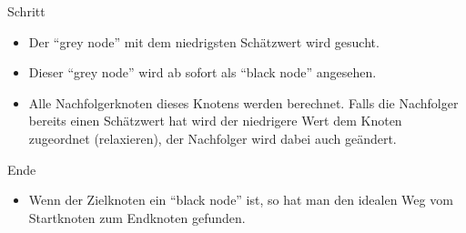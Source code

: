 \begin{frame}
	\begin{block}{Schritt}
		\begin{itemize}
			\item<2-> Der ``grey node'' mit dem niedrigsten Schätzwert wird gesucht.
			\item<3-> Dieser ``grey node'' wird ab sofort als ``black node'' angesehen.
			\item<4-> Alle Nachfolgerknoten dieses Knotens werden berechnet. Falls die Nachfolger bereits einen Schätzwert hat wird der niedrigere Wert dem Knoten zugeordnet (relaxieren), der Nachfolger wird dabei auch geändert.
		\end{itemize}
	\end{block}
\end{frame}

\begin{frame}
	\begin{block}{Ende}
		\begin{itemize}
			\item<2-> Wenn der Zielknoten ein ``black node'' ist, so hat man den idealen Weg vom Startknoten zum Endknoten gefunden.
		\end{itemize}
	\end{block}
\end{frame}

